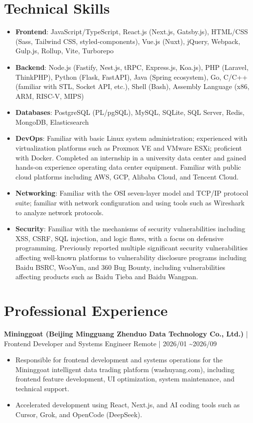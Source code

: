 \documentclass{resume}
\newcommand{\iconsection}[2]{
  \section[\texorpdfstring{#2}{#2}]{\faIcon{#1}\quad #2}
}
\begin{document}
  \iconsection{wrench}{Technical Skills}
  \begin{itemize}
    \item \textbf{Frontend}: JavaScript/TypeScript, React.js (Next.js, Gatsby.js), HTML/CSS (Sass, Tailwind CSS, styled-components), Vue.js (Nuxt), jQuery, Webpack, Gulp.js, Rollup, Vite, Turborepo
    \item \textbf{Backend}: Node.js (Fastify, Nest.js, tRPC, Express.js, Koa.js), PHP (Laravel, ThinkPHP), Python (Flask, FastAPI), Java (Spring ecosystem), Go, C/C++ (familiar with STL, Socket API, etc.), Shell (Bash), Assembly Language (x86, ARM, RISC-V, MIPS)
    \item \textbf{Databases}: PostgreSQL (PL/pgSQL), MySQL, SQLite, SQL Server, Redis, MongoDB, Elasticsearch
    \item \textbf{DevOps}: Familiar with basic Linux system administration; experienced with virtualization platforms such as Proxmox VE and VMware ESXi; proficient with Docker. Completed an internship in a university data center and gained hands-on experience operating data center equipment. Familiar with public cloud platforms including AWS, GCP, Alibaba Cloud, and Tencent Cloud.
    \item \textbf{Networking}: Familiar with the OSI seven-layer model and TCP/IP protocol suite; familiar with network configuration and using tools such as Wireshark to analyze network protocols.
    \item \textbf{Security}: Familiar with the mechanisms of security vulnerabilities including XSS, CSRF, SQL injection, and logic flaws, with a focus on defensive programming. Previously reported multiple significant security vulnerabilities affecting well-known platforms to vulnerability disclosure programs including Baidu BSRC, WooYun, and 360 Bug Bounty, including vulnerabilities affecting products such as Baidu Tieba and Baidu Wangpan.
  \end{itemize}

  \iconsection{building}{Professional Experience}

  \datedsubsection
  {\textbf{Mininggoat (Beijing Mingguang Zhenduo Data Technology Co., Ltd.)} | Frontend Developer and Systems Engineer}
  {Remote | 2026/01 \textasciitilde 2026/09}
  \begin{itemize}
    \item Responsible for frontend development and systems operations for the Mininggoat intelligent data trading platform (washuyang.com), including frontend feature development, UI optimization, system maintenance, and technical support.
    \item Accelerated development using React, Next.js, and AI coding tools such as Cursor, Grok, and OpenCode (DeepSeek).
  \end{itemize}
\end{document}
